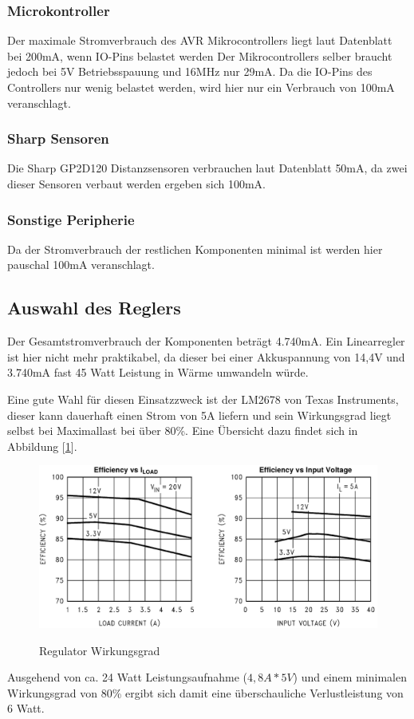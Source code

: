 

\subsubsection{Microkontroller}
Der maximale Stromverbrauch des AVR Mikrocontrollers liegt laut Datenblatt\cite{ds-at90can} bei 200mA, wenn IO-Pins belastet werden
Der Mikrocontrollers selber braucht jedoch bei 5V Betriebsspauung und 16MHz nur 29mA. Da die IO-Pins des Controllers nur wenig belastet werden,
wird hier nur ein Verbrauch von 100mA veranschlagt.

\subsubsection{Sharp Sensoren}
Die Sharp GP2D120 Distanzsensoren verbrauchen laut Datenblatt \cite{ds-sharp-GP2D120} 50mA, da zwei dieser Sensoren verbaut werden ergeben sich 100mA.

\subsubsection{Sonstige Peripherie}
Da der Stromverbrauch der restlichen Komponenten minimal ist werden hier pauschal 100mA veranschlagt.

\subsection{Auswahl des Reglers}
Der Gesamtstromverbrauch der Komponenten beträgt 4.740mA. Ein Linearregler ist hier nicht mehr praktikabel, da dieser bei einer Akkuspannung von 14,4V und 3.740mA fast 45 Watt Leistung in Wärme umwandeln würde.

Eine gute Wahl für diesen Einsatzzweck ist der LM2678 von Texas Instruments, dieser kann dauerhaft einen Strom von 5A liefern und sein Wirkungsgrad liegt selbst bei Maximallast bei über 80\%.
Eine Übersicht dazu findet sich in Abbildung [\ref{fig:vreg-eff}].
\begin{figure}[H]
\centering
\includegraphics[width=.8\textwidth]{vreg.png}\\
\caption{Regulator Wirkungsgrad \cite{ds-ti}}%
\label{fig:vreg-eff}
\end{figure}
Ausgehend von ca. 24 Watt Leistungsaufnahme ($4,8A*5V$) und einem minimalen Wirkungsgrad von 80\%  ergibt sich damit eine überschauliche Verlustleistung von 6 Watt.



